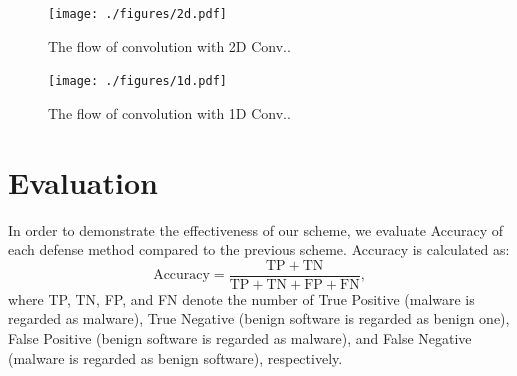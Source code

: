 \documentclass{ieeeaccess}
\begin{document}
\begin{figure}[t]
 \centering
 \texttt{[image: ./figures/2d.pdf]}
 \caption{The flow of convolution with 2D Conv..} 
 \label{fig:2d}
\end{figure}
\begin{figure}[t]
 \centering
 \texttt{[image: ./figures/1d.pdf]}
 \caption{The flow of convolution with 1D Conv..} 
 \label{fig:1d}
\end{figure}

\section{Evaluation} \label{sec:evaluation}
In order to demonstrate the effectiveness of our scheme, we evaluate Accuracy of each defense method compared to the previous scheme.
Accuracy is calculated as:
\begin{equation}
  \mathrm{Accuracy} = \frac{\mathrm{TP}+\mathrm{TN}}{\mathrm{TP} + \mathrm{TN} + \mathrm{FP} + \mathrm{FN}}, 
\end{equation}
where TP, TN, FP, and FN denote the number of True Positive (malware is regarded as malware), True Negative (benign software is regarded as benign one), False Positive (benign software is regarded as malware), and False Negative (malware is regarded as benign software), respectively.
\end{document}
